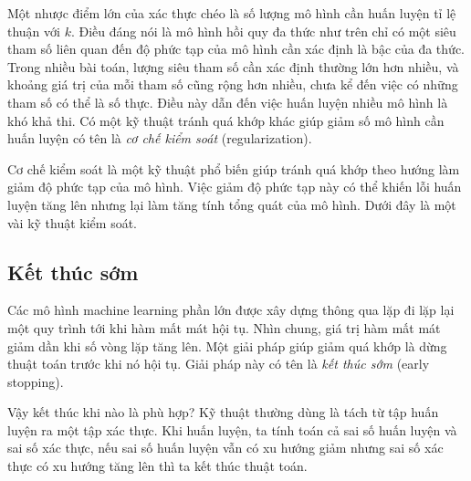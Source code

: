 Một nhược điểm lớn của xác thực chéo là số lượng mô hình cần huấn luyện tỉ lệ
thuận với $k$. Điều đáng nói là mô hình hồi quy đa thức như trên chỉ có một siêu
tham số liên quan đến độ phức tạp của mô hình cần xác định là bậc của đa thức.
Trong nhiều bài toán, lượng siêu tham số cần xác định thường lớn hơn nhiều, và
khoảng giá trị của mỗi tham số cũng rộng hơn nhiều, chưa kể đến việc có những
tham số có thể là số thực. Điều này dẫn đến việc huấn luyện nhiều mô hình là khó
khả thi. Có một kỹ thuật tránh quá khớp khác giúp giảm số mô hình cần huấn
luyện có tên là \textit{cơ chế kiểm soát} (regularization).
 
{Cơ chế kiểm soát} là một kỹ thuật phổ biến giúp tránh quá khớp theo hướng làm
giảm độ phức tạp của mô hình. Việc giảm độ phức tạp này có thể khiến lỗi huấn
luyện tăng lên nhưng lại làm tăng tính tổng quát của mô hình. Dưới đây là một
vài kỹ thuật kiểm soát.

\subsection{Kết thúc sớm}
Các mô hình machine learning phần lớn được xây dựng thông qua lặp đi lặp lại một
quy trình tới khi hàm mất mát hội tụ. Nhìn chung, giá trị hàm mất mát giảm dần
khi số vòng lặp tăng lên. Một giải pháp giúp giảm quá khớp là dừng thuật toán
trước khi nó hội tụ. Giải pháp này có tên là \textit{kết thúc sớm} (early stopping).

Vậy kết thúc khi nào là phù hợp? Kỹ thuật thường dùng là tách từ tập huấn luyện ra
một tập xác thực. Khi huấn luyện, ta tính toán cả sai số huấn luyện và sai số
xác thực, nếu sai số huấn luyện vẫn có xu hướng giảm nhưng sai số xác thực có xu
hướng tăng lên thì ta kết thúc thuật toán.

 

